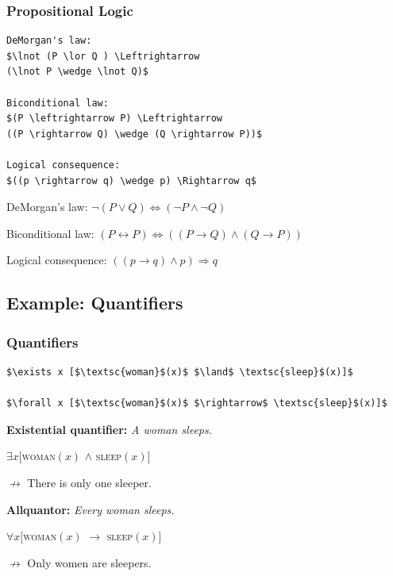 \begin{frame}[fragile]
\frametitle{Propositional Logic}

{\small
\begin{lstlisting}
DeMorgan's law:
$\lnot (P \lor Q ) \Leftrightarrow 
(\lnot P \wedge \lnot Q)$

Biconditional law:
$(P \leftrightarrow P) \Leftrightarrow 
((P \rightarrow Q) \wedge (Q \rightarrow P))$

Logical consequence:
$((p \rightarrow q) \wedge p) \Rightarrow q$
\end{lstlisting}
}

\pause 

\ea DeMorgan's law:
$\lnot (P \lor Q ) \Leftrightarrow 
(\lnot P \wedge \lnot Q)$

\ex Biconditional law:
$(P \leftrightarrow P) \Leftrightarrow 
((P \rightarrow Q) \wedge (Q \rightarrow P))$

\ex Logical consequence:
$((p \rightarrow q) \wedge p) \Rightarrow q$

\z 

\end{frame}


\subsection{Example: Quantifiers}

\begin{frame}[fragile]
\frametitle{Quantifiers}

{\small
\begin{lstlisting}
$\exists x [$\textsc{woman}$(x)$ $\land$ \textsc{sleep}$(x)]$ 

$\forall x [$\textsc{woman}$(x)$ $\rightarrow$ \textsc{sleep}$(x)]$
\end{lstlisting}
}


\pause 


\ea \textbf{Existential quantifier:} \emph{A woman sleeps.}

	$\exists x [$\textsc{woman}$(x)$ $\land$ \textsc{sleep}$(x)]$ 


$\nrightarrow$ There is only one sleeper.	 


\pause 


\ex \textbf{Allquantor:} \emph{Every woman sleeps.}

	$\forall x [$\textsc{woman}$(x)$ $\rightarrow$ \textsc{sleep}$(x)]$


$\nrightarrow$ Only women are sleepers. 
\z 

\end{frame}



